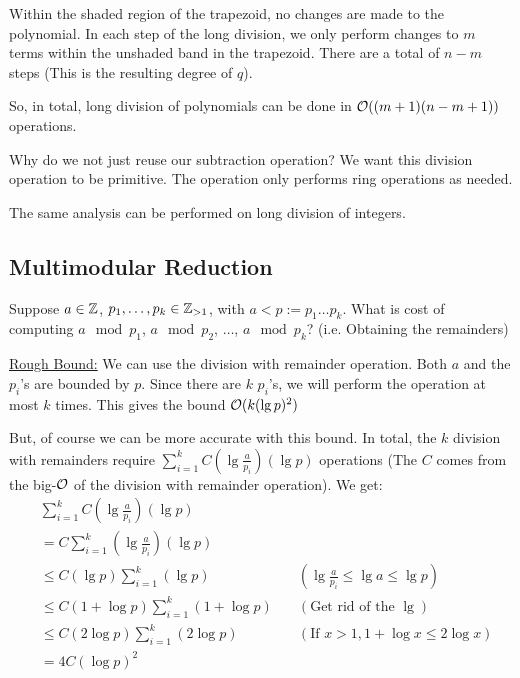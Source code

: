 Within the shaded region of the trapezoid, no changes are made to the polynomial.
In each step of the long division, we only perform changes to $m$ terms within the unshaded band in the trapezoid.
There are a total of $n-m$ steps (This is the resulting degree of $q$).

So, in total, long division of polynomials can be done in $\operatorname{\mathcal{O}}((m+1)(n-m+1))$ operations.

\begin{note}
    Why do we not just reuse our subtraction operation? We want this division operation to be primitive. The operation only performs ring operations as needed.
\end{note}

The same analysis can be performed on long division of integers.

\subsection{Multimodular Reduction}
Suppose $a \in \operatorname{\mathbb{Z}}$, $p_1, \ldots, p_k \in \operatorname{\mathbb{Z}}_{> 1}$, with $a < p := p_1\ldots p_k$. What is cost of computing $a \mod p_1$, $a \mod p_2$, $\ldots$, $a \mod p_k$? (i.e. Obtaining the remainders)

\ul{Rough Bound:} We can use the division with remainder operation.
Both $a$ and the $p_i$'s are bounded by $p$.
Since there are $k$ $p_i$'s, we will perform the operation at most $k$ times.
This gives the bound $\operatorname{\mathcal{O}}(k(\lg p)^2)$

But, of course we can be more accurate with this bound.
In total, the $k$ division with remainders require $\sum_{i = 1}^k C\left(\lg \frac{a}{p_i}\right)\left(\lg p\right)$ operations (The $C$ comes from the big-$\operatorname{\mathcal{O}}$ of the division with remainder operation).
We get:
\begin{equation*}
\begin{aligned}
    &\sum_{i = 1}^k C\left(\lg \frac{a}{p_i}\right)\left(\lg p\right)\\
    &= C \sum_{i = 1}^k \left(\lg \frac{a}{p_i}\right)\left(\lg p\right) \\
    &\leq C \left(\lg p\right) \sum_{i = 1}^k \left(\lg p\right) \quad &(\lg \frac{a}{p_i} \leq \lg a \leq \lg p) \\
    &\leq C (1 + \log p) \sum_{i = 1}^k (1 + \log p) \quad & (\text{Get rid of the }\lg)\\
    &\leq C (2\log p) \sum_{i = 1}^k (2\log p) \quad & (\text{If } x > 1, 1 + \log x \leq 2\log x)\\
    &=4C(\log p)^2
\end{aligned}
\end{equation*}